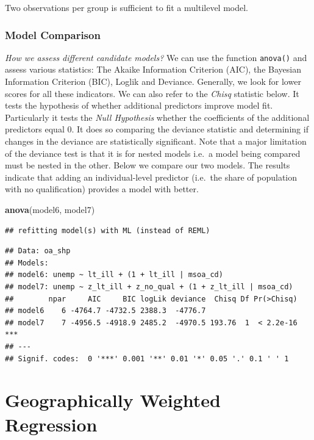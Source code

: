 \documentclass[
]{book}
\newenvironment{Shaded}{\begin{snugshade}}{\end{snugshade}}
\newcommand{\KeywordTok}[1]{\textcolor[rgb]{0.13,0.29,0.53}{\textbf{#1}}}
\newcommand{\NormalTok}[1]{#1}
\begin{document}
Two observations per group is sufficient to fit a multilevel model.

\hypertarget{model-comparison}{%
\subsection{Model Comparison}\label{model-comparison}}

\emph{How we assess different candidate models?} We can use the function \texttt{anova()} and assess various statistics: The Akaike Information Criterion (AIC), the Bayesian Information Criterion (BIC), Loglik and Deviance. Generally, we look for lower scores for all these indicators. We can also refer to the \emph{Chisq} statistic below. It tests the hypothesis of whether additional predictors improve model fit. Particularly it tests the \emph{Null Hypothesis} whether the coefficients of the additional predictors equal 0. It does so comparing the deviance statistic and determining if changes in the deviance are statistically significant. Note that a major limitation of the deviance test is that it is for nested models i.e.~a model being compared must be nested in the other. Below we compare our two models. The results indicate that adding an individual-level predictor (i.e.~the share of population with no qualification) provides a model with better.

\begin{Shaded}
\begin{Highlighting}[]
\KeywordTok{anova}\NormalTok{(model6, model7)}
\end{Highlighting}
\end{Shaded}

\begin{verbatim}
## refitting model(s) with ML (instead of REML)
\end{verbatim}

\begin{verbatim}
## Data: oa_shp
## Models:
## model6: unemp ~ lt_ill + (1 + lt_ill | msoa_cd)
## model7: unemp ~ z_lt_ill + z_no_qual + (1 + z_lt_ill | msoa_cd)
##        npar     AIC     BIC logLik deviance  Chisq Df Pr(>Chisq)    
## model6    6 -4764.7 -4732.5 2388.3  -4776.7                         
## model7    7 -4956.5 -4918.9 2485.2  -4970.5 193.76  1  < 2.2e-16 ***
## ---
## Signif. codes:  0 '***' 0.001 '**' 0.01 '*' 0.05 '.' 0.1 ' ' 1
\end{verbatim}

\hypertarget{geographically-weighted-regression}{%
\chapter{Geographically Weighted Regression}\label{geographically-weighted-regression}}
\end{document}
